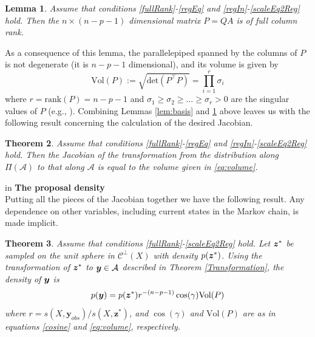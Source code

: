 \documentclass[11pt]{article}
\newcommand{\by}{\mbox{\boldmath $y$}}
\newcommand{\bz}{\mbox{\boldmath $z$}}
\newcommand{\mc}{\mathcal}
\newtheorem{theorem}{Theorem}[section]
\newtheorem{lemma}[theorem]{\bf Lemma}
\begin{document}
\begin{lemma}
\label{lem:fullrank}
Assume that conditions \ref{fullRank}-\ref{regEq} and \ref{regIn}-\ref{scaleEq2Reg} hold.  
Then the $n\times (n-p-1)$ dimensional matrix $P=QA$ is of full column rank.
\end{lemma}

As a consequence of this lemma, 
the parallelepiped spanned by the columns of $P$ is not
degenerate (it is $n-p-1$ dimensional), and its volume
is given by
\begin{equation}
\label{eq:volume}
\text{Vol} (P) := \sqrt{\text{det}(P^\top P)}=\prod_{i=1}^{r} \sigma_i
\end{equation}
where $r=\text{rank} (P)=n-p-1$ and $\sigma_1\geq
\sigma_2\geq\dots\geq\sigma_r>0$ are the singular values of $P$ (e.g.,
\cite{miao1992}). 
Combining Lemmas \ref{lem:basis} and \ref{lem:fullrank} above leaves us with the following result concerning the calculation of the desired Jacobian.  
\begin{theorem}
\label{Jacobian}
Assume that conditions \ref{fullRank}-\ref{regEq} and \ref{regIn}-\ref{scaleEq2Reg} hold.  Then the
Jacobian of the transformation from the distribution along 
$\Pi(\mc A)$ to that along $\mc A $ is equal to the volume given in \eqref{eq:volume}.
\end{theorem}

 in
\noindent
{\bf The proposal density} \\
Putting all the pieces of the Jacobian together we have the following result. Any dependence on other variables, including current states in the Markov chain, is made implicit. 
\begin{theorem} 
Assume that conditions \ref{fullRank}-\ref{scaleEq2Reg} hold.  Let $\bz^{*}$ be sampled on the unit sphere in $\mc {C}^\perp (X)$ with density $p(\bz^{*})$.  Using the transformation of $\bz^*$ to $\by\in \mc A$ described in Theorem \ref{Transformation}, the density of $\by$ is
\begin{equation}
\label{dens:ystst}
p(\by)=p(\bz^*) r^{-(n-p-1)} \cos(\gamma)\text{Vol} (P)
\end{equation}
where $r={s(X,\boldsymbol{y}_{obs})}/{s(X,  \boldsymbol{z}^{*})}$,
and $\cos(\gamma)$ and $\text{Vol} (P)$ are as in equations \eqref{cosine} and \eqref{eq:volume}, respectively. 
\end{theorem} 
\end{document}
